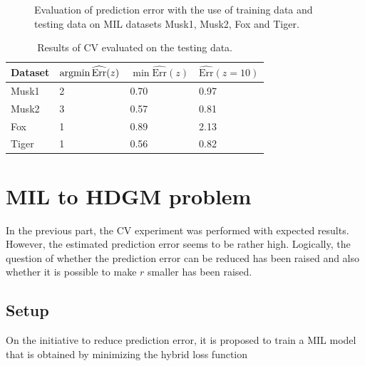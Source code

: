 \begin{figure}[h]
	\caption{Evaluation of prediction error with the use of training data and testing data on MIL datasets Musk1, Musk2, Fox and Tiger. }%
	\label{CV}%
\end{figure}

\begin{table}[h]
	\centering
	\begin{tabular}{|l|l|l|l|}
		\hline
		Dataset  &$\mathop{\mathrm{argmin}} \widehat{\mathrm{Err}}(z)$ & $ \min \widehat{\mathrm{Err}}(z)$ &$\widehat{\mathrm{Err}}(z=10)$ \\ \hline
		Musk1              & 2        & 0.70& 0.97   \\ \hline
		Musk2              & 3        & 0.57& 0.81   \\ \hline
		Fox               & 1        & 0.89 &  2.13 \\ \hline
		Tiger               & 1        & 0.56  & 0.82    \\ \hline
	\end{tabular}
	\caption{Results of CV evaluated on the testing data.}
	\label{tab:resultsCV}
\end{table}




\section{MIL to HDGM problem}
In the previous part, the CV experiment was performed with expected results. However, the estimated prediction error seems to be rather high. Logically, the question of whether the prediction error can be reduced has been raised and also whether it is possible to make $r$ smaller has been raised.
\subsection{Setup}
On the initiative to reduce prediction error, it is proposed to train a MIL model that is obtained by minimizing the hybrid loss function 

